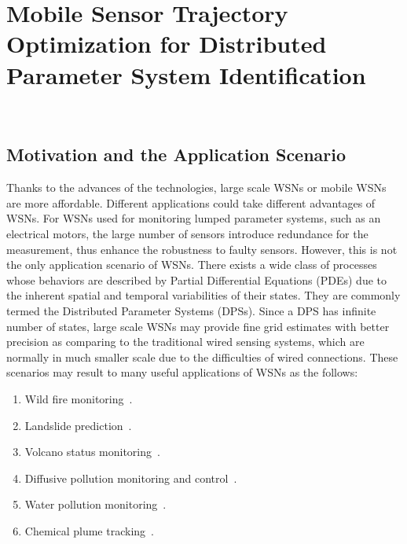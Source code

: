 \chapter{Mobile Sensor Trajectory Optimization for Distributed Parameter System Identification}~\label{s:MasnetIROS}
\section{Motivation and the Application Scenario}
Thanks to the advances of the technologies, large scale WSNs or mobile WSNs are more affordable. Different applications could take different advantages of  WSNs. For WSNs used for monitoring lumped parameter systems, such as an electrical motors, the large number of sensors introduce redundance for the measurement, thus enhance the robustness to faulty sensors.
    However, this is not the only application scenario of WSNs. There exists a wide class of processes whose behaviors are described by Partial Differential Equations (PDEs) due to the inherent spatial and temporal variabilities of their states. They are commonly termed the Distributed Parameter Systems (DPSs). Since a DPS has infinite number of states, large scale WSNs may provide fine grid estimates with better precision as comparing to the traditional wired sensing systems, which are normally in much smaller scale due to the difficulties of wired connections. These scenarios may result to many useful applications of WSNs as the follows:

\begin{enumerate}
\item Wild fire monitoring~\cite{DoolinaFirebugSPIE05}.
\item Landslide prediction~\cite{MooreLandslide}.
\item Volcano status monitoring~\cite{Werner-Allen2006}.
\item Diffusive pollution monitoring and control~\cite{MASnetSPIE04ZoneControl, masnetspie04pathplan}.
\item Water pollution monitoring~\cite{OgrenCooperativeControl}.
\item Chemical plume tracking~\cite{SpearPlum04}.
\end{enumerate}



